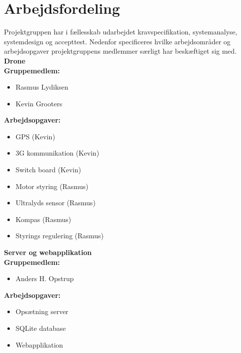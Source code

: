 \section{Arbejdsfordeling}

Projektgruppen har i fællesskab udarbejdet kravspecifikation, systemanalyse, systemdesign og accepttest. 
Nedenfor specificeres hvilke arbejdsområder og arbejdsopgaver projektgruppens medlemmer særligt har beskæftiget sig med.\\

{\LARGE \textbf{Drone \vspace{0.2cm}}}\\
\textbf{Gruppemedlem:}
\begin{itemize}
\item Rasmus Lydiksen 
\item Kevin Grooters \\
\end{itemize}

\vspace{-0.3cm}

\textbf{Arbejdsopgaver:}
\begin{itemize}
\item GPS (Kevin)
\item 3G kommunikation (Kevin)
\item Switch board (Kevin)
\item Motor styring (Rasmus)
\item Ultralyds sensor (Rasmus)
\item Kompas (Rasmus)
\item Styrings regulering (Rasmus)\\
\end{itemize}

\vspace{0.5cm}

{\LARGE \textbf{Server og webapplikation \vspace{0.2cm}}}\\
\textbf{Gruppemedlem:}
\begin{itemize}
\item Anders H. Opstrup \\
\end{itemize}

\vspace{-0.3cm}

\textbf{Arbejdsopgaver:}
\begin{itemize}
\item Opsætning server
\item SQLite database
\item Webapplikation
\end{itemize}

